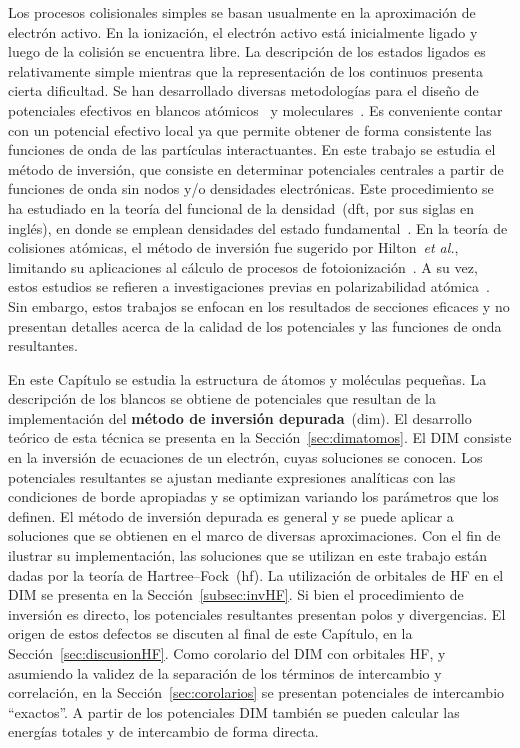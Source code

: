 Los procesos colisionales simples se basan usualmente en la 
aproximación de electrón activo. En la ionización, el electrón activo 
está inicialmente ligado y luego de la colisión se encuentra libre. La 
descripción de los estados ligados es relativamente simple mientras que 
la representación de los continuos presenta cierta dificultad. Se han 
desarrollado diversas metodologías para el diseño de potenciales 
efectivos en blancos atómicos~\cite{Hibbert:82,Gombas:56,Green:69,
Klapisch:71,Phillips:59,Herman:63,Dalgarno:70,Bayliss:77,Cowan:76,
Lee:77} y moleculares~\cite{Menchero:10,Granados:16}. Es conveniente 
contar con un potencial efectivo local ya que permite obtener de forma 
consistente las funciones de onda de las partículas interactuantes. 
En este trabajo se estudia el método de inversión, que consiste en 
determinar potenciales centrales a partir de funciones de onda sin nodos 
y/o densidades electrónicas. Este procedimiento se ha estudiado en la 
teoría del funcional de la densidad~(\acs{dft}, por sus siglas en 
inglés), en donde se emplean densidades del estado 
fundamental~\cite{Wu:03,Gaiduk:13,Ryabinkin:15,Schipper:97,deSilva:12,
Kananenka:13,Jacob:11}. En la teoría de colisiones atómicas, el método 
de inversión fue sugerido por Hilton~\textit{et al.}, limitando su 
aplicaciones al cálculo de procesos de fotoionización~\cite{Hilton:77,
Suzer:77,Hilton:79,Hilton:80,Crljen:87}. A su vez, estos estudios se 
refieren a investigaciones previas en polarizabilidad 
atómica~\cite{Sternheimer:54,Dalgarno:59}. Sin embargo, estos trabajos 
se enfocan en los resultados de secciones eficaces y no presentan 
detalles acerca de la calidad de los potenciales y las funciones de onda 
resultantes. 

En este Capítulo se estudia la estructura de átomos y moléculas pequeñas. 
La descripción de los blancos se obtiene de potenciales que resultan de 
la implementación del \textbf{método de inversión depurada}~(\acs{dim}). 
El desarrollo teórico de esta técnica se presenta en la 
Sección~\ref{sec:dimatomos}. El DIM consiste en la inversión de 
ecuaciones de un electrón, cuyas soluciones se conocen. 
Los potenciales resultantes se ajustan mediante expresiones 
analíticas con las condiciones de borde apropiadas y se optimizan 
variando los parámetros que los definen. El método de inversión depurada 
es general y se puede aplicar a soluciones que se obtienen en el marco 
de diversas aproximaciones. Con el fin de ilustrar su implementación, 
las soluciones que se utilizan en este trabajo están dadas por la 
teoría de Hartree--Fock~(\acs{hf}). La utilización de orbitales de HF en 
el DIM se presenta en la Sección~\ref{subsec:invHF}. Si bien el 
procedimiento de inversión es directo, los potenciales resultantes 
presentan polos y divergencias. El origen de estos defectos se discuten 
al final de este Capítulo, en la Sección~\ref{sec:discusionHF}. Como 
corolario del DIM con orbitales HF, y asumiendo la 
validez de la separación de los términos de intercambio y correlación, 
en la Sección~\ref{sec:corolarios} se presentan potenciales de 
intercambio ``exactos''. A partir de los potenciales DIM también se 
pueden calcular las energías totales y de intercambio de forma directa. 

